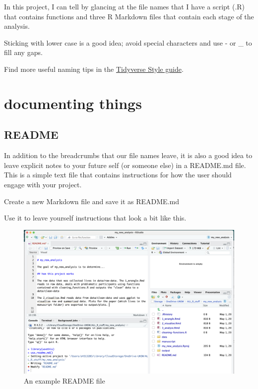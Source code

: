 \documentclass[
  letterpaper,
  DIV=11,
  numbers=noendperiod]{scrreprt}
\begin{document}
In this project, I can tell by glancing at the file names that I have a
script (.R) that contains functions and three R Markdown files that
contain each stage of the analysis.

Sticking with lower case is a good idea; avoid special characters and
use - or \_ to fill any gaps.

Find more useful naming tips in the
\href{https://style.tidyverse.org/files.html}{Tidyverse Style guide}.

\section{documenting things}\label{documenting-things}

\subsection{README}\label{readme}

In addition to the breadcrumbs that our file names leave, it is also a
good idea to leave explicit notes to your future self (or someone else)
in a README.md file. This is a simple text file that contains
instructions for how the user should engage with your project.

Create a new Markdown file and save it as README.md

Use it to leave yourself instructions that look a bit like this.

\begin{figure}[H]

{\centering \includegraphics{images/readme.png}

}

\caption{An example README file}

\end{figure}%
\end{document}
